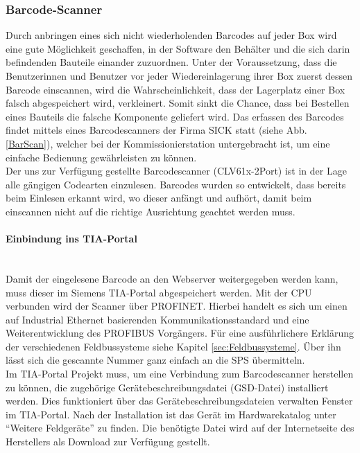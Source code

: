 \subsubsection{Barcode-Scanner} \label{sec:Barcodescanner}
Durch anbringen eines sich nicht wiederholenden Barcodes auf jeder Box wird eine gute Möglichkeit geschaffen, in der Software den Behälter und die sich darin befindenden Bauteile einander zuzuordnen. Unter der Voraussetzung, dass die Benutzerinnen und Benutzer vor jeder Wiedereinlagerung ihrer Box zuerst dessen Barcode einscannen, wird die Wahrscheinlichkeit, dass der Lagerplatz einer Box falsch abgespeichert wird, verkleinert. Somit sinkt die Chance, dass bei Bestellen eines Bauteils die falsche Komponente geliefert wird. Das erfassen des Barcodes findet mittels eines Barcodescanners der Firma SICK statt (siehe Abb. \ref{BarScan}), welcher bei der Kommissionierstation untergebracht ist, um eine einfache Bedienung gewährleisten zu können.\\
Der uns zur Verfügung gestellte Barcodescanner (CLV61x-2Port) ist in der Lage alle gängigen Codearten einzulesen.\cite{Barcodescanner} Barcodes wurden so entwickelt, dass bereits beim Einlesen erkannt wird, wo dieser anfängt und aufhört, damit beim einscannen nicht auf die richtige Ausrichtung geachtet werden muss.

\paragraph{Einbindung ins TIA-Portal \cite{BarScan_Handbuch}}\mbox{}\\
Damit der eingelesene Barcode an den Webserver weitergegeben werden kann, muss dieser im Siemens TIA-Portal abgespeichert werden. Mit der CPU verbunden wird der Scanner über PROFINET. Hierbei handelt es sich um einen auf Industrial Ethernet basierenden Kommunikationsstandard und eine Weiterentwicklung des PROFIBUS Vorgängers. Für eine ausführlichere Erklärung der verschiedenen Feldbussysteme siehe Kapitel \ref{sec:Feldbussysteme}. Über ihn lässt sich die gescannte Nummer ganz einfach an die SPS übermitteln.\\
Im TIA-Portal Projekt muss, um eine Verbindung zum Barcodescanner herstellen zu können, die zugehörige Gerätebeschreibungsdatei (GSD-Datei) installiert werden. Dies funktioniert über das Gerätebeschreibungsdateien verwalten Fenster im TIA-Portal. Nach der Installation ist das Gerät im Hardwarekatalog unter \enquote{Weitere Feldgeräte} zu finden. Die benötigte Datei wird auf der Internetseite des Herstellers als Download zur Verfügung gestellt.

